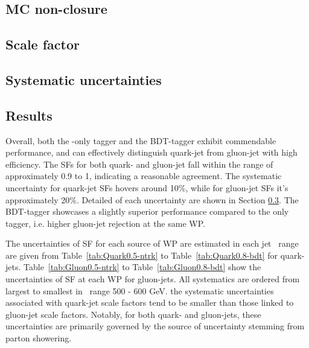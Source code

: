 \subsection{MC non-closure}
\label{sec:QG-closure}


\subsection{Scale factor}
\label{sec:QG-SF}


\subsection{Systematic uncertainties}
\label{sec:QG-syst}


\subsection{Results}

Overall, both the \ntrk-only tagger and the BDT-tagger exhibit commendable performance, and can effectively distinguish quark-jet from gluon-jet with high efficiency. The SFs for both quark- and gluon-jet  fall within the range of approximately 0.9 to 1, indicating a reasonable agreement. The systematic uncertainty for quark-jet SFs hovers around 10\%, while for gluon-jet SFs it's approximately 20\%.  Detailed of each uncertainty are shown in Section \ref{sec:QG-syst}. The BDT-tagger showcases a slightly superior performance compared to the {\ntrk} only tagger, i.e. higher gluon-jet rejection at the same WP.

The uncertainties of SF for each source of WP are estimated in each jet \pt~range are given from Table~\ref{tab:Quark0.5-ntrk} to Table~\ref{tab:Quark0.8-bdt} for quark-jets. Table~\ref{tab:Gluon0.5-ntrk} to Table~\ref{tab:Gluon0.8-bdt} show the uncertainties of SF at each WP for gluon-jets. All systematics are ordered from largest to smallest in \pt~range 500 - 600 GeV. the systematic uncertainties associated with quark-jet scale factors tend to be smaller than those linked to gluon-jet scale factors. Notably, for both quark- and gluon-jets, these uncertainties are primarily governed by the source of uncertainty stemming from parton showering.



